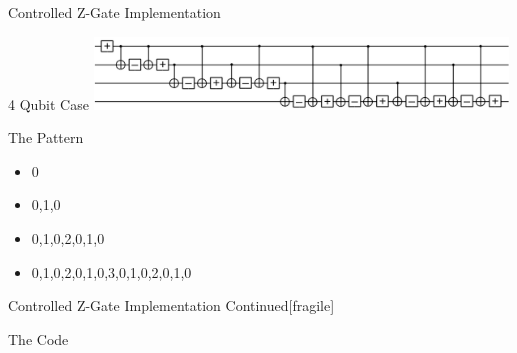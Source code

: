 \documentclass{beamer}
\begin{document}
\begin{frame}{Controlled Z-Gate Implementation}

\begin{block}{4 Qubit Case}
\includegraphics[width=11cm]{4qubitcontrolledzgate.jpg}
\end{block}

\begin{block}{The Pattern}
\begin{itemize}
  \item 0
  \item 0,1,0
  \item 0,1,0,2,0,1,0
  \item 0,1,0,2,0,1,0,3,0,1,0,2,0,1,0
\end{itemize}
\end{block}
\end{frame}


\begin{frame}{Controlled Z-Gate Implementation Continued}[fragile]
\begin{block}{The Code}
\end{block}
\end{frame}
\end{document}
